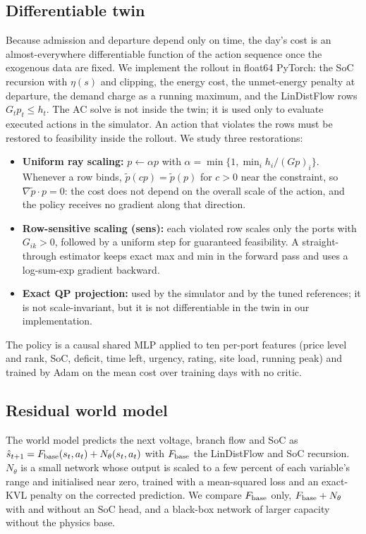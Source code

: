 \documentclass[11pt]{article}
\begin{document}
\subsection{Differentiable twin}\label{sec:twinmethod}
Because admission and departure depend only on time, the day's cost is an almost-everywhere differentiable function of the action sequence once the exogenous data are fixed. We implement the rollout in float64 PyTorch: the SoC recursion with $\eta(s)$ and clipping, the energy cost, the unmet-energy penalty at departure, the demand charge as a running maximum, and the LinDistFlow rows $G_tp_t\le h_t$. The AC solve is not inside the twin; it is used only to evaluate executed actions in the simulator. An action that violates the rows must be restored to feasibility inside the rollout. We study three restorations:
\begin{itemize}
\item \textbf{Uniform ray scaling:} $p\leftarrow\alpha p$ with $\alpha=\min\{1,\min_i h_i/(Gp)_i\}$. Whenever a row binds, $\tilde p(cp)=\tilde p(p)$ for $c>0$ near the constraint, so $\nabla\tilde p\cdot p=0$: the cost does not depend on the overall scale of the action, and the policy receives no gradient along that direction.
\item \textbf{Row-sensitive scaling (sens):} each violated row scales only the ports with $G_{ik}>0$, followed by a uniform step for guaranteed feasibility. A straight-through estimator keeps exact max and min in the forward pass and uses a log-sum-exp gradient backward.
\item \textbf{Exact QP projection:} used by the simulator and by the tuned references; it is not scale-invariant, but it is not differentiable in the twin in our implementation.
\end{itemize}
The policy is a causal shared MLP applied to ten per-port features (price level and rank, SoC, deficit, time left, urgency, rating, site load, running peak) and trained by Adam on the mean cost over training days with no critic.

\subsection{Residual world model}
The world model predicts the next voltage, branch flow and SoC as $\hat s_{t+1}=F_{\rm base}(s_t,a_t)+N_\theta(s_t,a_t)$ with $F_{\rm base}$ the LinDistFlow and SoC recursion. $N_\theta$ is a small network whose output is scaled to a few percent of each variable's range and initialised near zero, trained with a mean-squared loss and an exact-KVL penalty on the corrected prediction. We compare $F_{\rm base}$ only, $F_{\rm base}+N_\theta$ with and without an SoC head, and a black-box network of larger capacity without the physics base.
\end{document}
